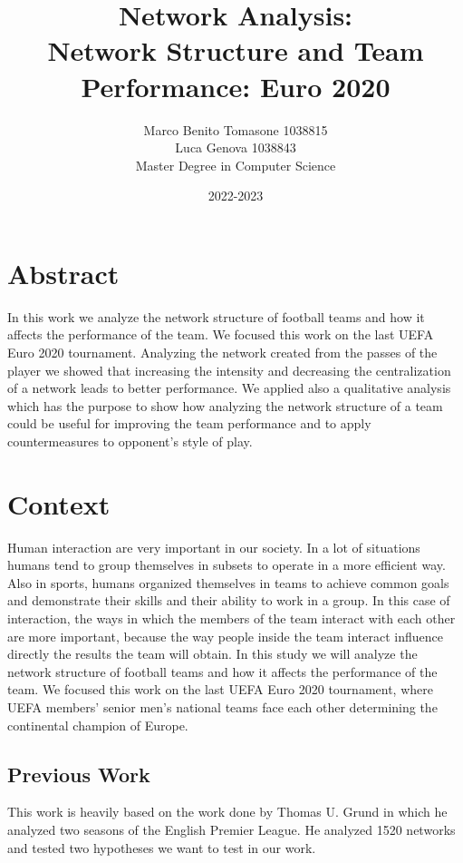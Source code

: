 \documentclass[12pt, a4paper]{article}
\author{Marco Benito Tomasone 1038815 \\ 
        Luca Genova  1038843\\
 Master Degree in Computer Science\\}
\date{2022-2023}
\title{Network Analysis:\\ Network Structure and Team Performance: Euro 2020}
\begin{document}
\maketitle

\section{Abstract}
\label{abstract}
In this work we analyze the network structure of football teams and how it affects the performance of the team. We focused this work on the last UEFA Euro 2020 tournament. Analyzing the network created from the passes of the player we showed that increasing the intensity and decreasing the centralization of a network leads to better performance. We applied also a qualitative analysis which has the purpose to show how analyzing the network structure of a team could be useful for improving the team performance and to apply countermeasures to opponent's style of play.\\

\section{Context}
\label{context}
Human interaction are very important in our society. In a lot of situations humans tend to group themselves in subsets to operate in a more efficient way. Also in sports, humans organized themselves in teams to achieve common goals and demonstrate their skills and their ability to work in a group. In this case of interaction, the ways in which the members of the team interact with each other are more important, because the way people inside the team interact influence directly the results the team will obtain. In this study we will analyze the network structure of football teams and how it affects the performance of the team. We focused this work on the last UEFA Euro 2020 tournament, where UEFA members' senior men's national teams face each other determining the continental champion of Europe.
\subsection{Previous Work}
This work is heavily based on the work done by Thomas U. Grund \cite{GRUND} in which he analyzed two seasons of the English Premier League. He analyzed 1520 networks and tested two hypotheses we want to test in our work. 
\end{document}
